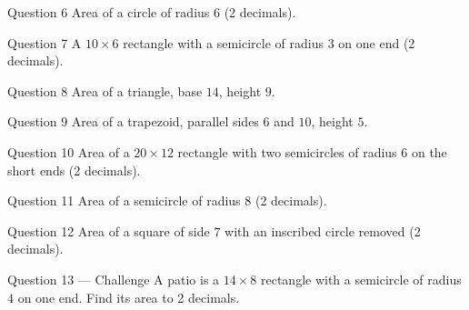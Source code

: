\documentclass[11pt]{article}
\begin{document}
\begin{qbox}{Question 6}
Area of a circle of radius $6$ (2 decimals).\workspace{2.4cm}
\end{qbox}

\begin{qbox}{Question 7}
A $10\times6$ rectangle with a semicircle of radius $3$ on one end (2 decimals).\workspace{2.4cm}
\end{qbox}

\begin{qbox}{Question 8}
Area of a triangle, base $14$, height $9$.\workspace{2.4cm}
\end{qbox}

\begin{qbox}{Question 9}
Area of a trapezoid, parallel sides $6$ and $10$, height $5$.\workspace{2.4cm}
\end{qbox}

\begin{qbox}{Question 10}
Area of a $20\times12$ rectangle with two semicircles of radius $6$ on the short ends (2 decimals).\workspace{2.4cm}
\end{qbox}

\begin{qbox}{Question 11}
Area of a semicircle of radius $8$ (2 decimals).\workspace{2.4cm}
\end{qbox}

\begin{qbox}{Question 12}
Area of a square of side $7$ with an inscribed circle removed (2 decimals).\workspace{2.4cm}
\end{qbox}

\begin{qbox}{Question 13 --- Challenge}
A patio is a $14\times8$ rectangle with a semicircle of radius $4$ on one end. Find its area to 2 decimals.\workspace{3cm}
\end{qbox}

\clearpage
{}
\end{document}
